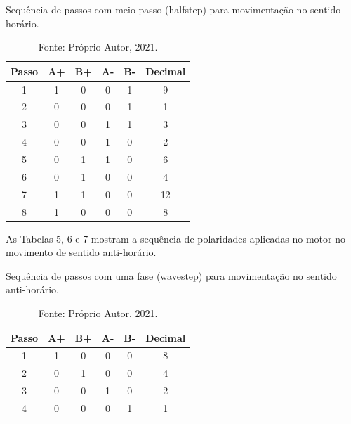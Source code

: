 \begin{table}
    \centering
    \caption{Sequência de passos com meio passo (halfstep) para movimentação no sentido horário.}
    \begin{tabular}{cccccc}
        \hline
        \textbf{Passo} & \textbf{A+} & \textbf{B+} & \textbf{A-} & \textbf{B-} & \textbf{Decimal}\\
        \hline
        1 & 1 & 0 & 0 & 1 & 9\\
        2 & 0 & 0 & 0 & 1 & 1\\
        3 & 0 & 0 & 1 & 1 & 3\\
        4 & 0 & 0 & 1 & 0 & 2\\
        5 & 0 & 1 & 1 & 0 & 6\\
        6 & 0 & 1 & 0 & 0 & 4\\
        7 & 1 & 1 & 0 & 0 & 12\\
        8 & 1 & 0 & 0 & 0 & 8\\
        \hline       
    \end{tabular}
    \caption*{Fonte: Próprio Autor, 2021.}
    \label{tab:halfstephorario}
\end{table}

As Tabelas 5, 6 e 7 mostram a sequência de polaridades aplicadas no motor no movimento de sentido anti-horário.

\begin{table}
    \centering
    \caption{Sequência de passos com uma fase (wavestep) para movimentação no sentido anti-horário.}
    \begin{tabular}{cccccc}
        \hline
        \textbf{Passo} & \textbf{A+} & \textbf{B+} & \textbf{A-} & \textbf{B-} & \textbf{Decimal}\\
        \hline
        1 & 1 & 0 & 0 & 0 & 8\\
        2 & 0 & 1 & 0 & 0 & 4\\
        3 & 0 & 0 & 1 & 0 & 2\\
        4 & 0 & 0 & 0 & 1 & 1\\
        \hline       
    \end{tabular}
    \caption*{Fonte: Próprio Autor, 2021.}
    \label{tab:wavestepantihorario}
\end{table}

